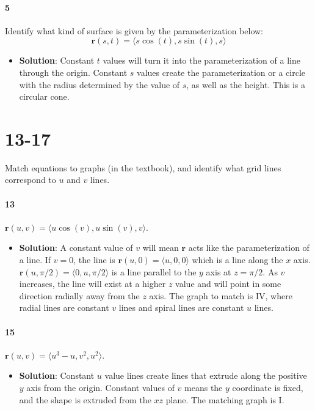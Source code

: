 \documentclass{article}
\begin{document}
    \paragraph{5} Identify what kind of surface is given by the parameterization below:
    \[ \mathbf{r}(s,t) = \langle s\cos(t), s\sin(t), s \rangle \]
    \begin{itemize}
        \item \textbf{Solution}: Constant $t$ values will turn it into the parameterization of a line through the origin. Constant $s$ values create the parameterization or a circle with the radius determined by the value of $s$, as well as the height. This is a circular cone.
    \end{itemize}

    \section*{13-17} Match equations to graphs (in the textbook), and identify what grid lines correspond to $u$ and $v$ lines.
    \paragraph{13} $\mathbf{r}(u,v) = \langle u\cos(v), u\sin(v), v \rangle$. 
    \begin{itemize}
        \item \textbf{Solution}: A constant value of $v$ will mean $\mathbf{r}$ acts like the parameterization of a line. If $v=0$, the line is $\mathbf{r}(u,0) = \langle u, 0, 0 \rangle$ which is a line along the $x$ axis. $\mathbf{r}(u,\pi/2) = \langle 0, u, \pi/2 \rangle$ is a line parallel to the $y$ axis at $z=\pi/2$. As $v$ increases, the line will exist at a higher $z$ value and will point in some direction radially away from the $z$ axis. The graph to match is IV, where radial lines are constant $v$ lines and spiral lines are constant $u$ lines.
    \end{itemize}
    
    \paragraph{15} $\mathbf{r}(u,v) = \langle u^3-u, v^2, u^2 \rangle$. 
    \begin{itemize}
        \item \textbf{Solution}: Constant $u$ value lines create lines that extrude along the positive $y$ axis from the origin. Constant values of $v$ means the $y$ coordinate is fixed, and the shape is extruded from the $xz$ plane. The matching graph is I.
    \end{itemize}
    
\end{document}

